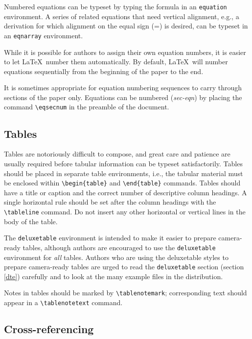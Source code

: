 Numbered equations can be typeset by typing the formula in
an {\tt equation} environment.
A series of related equations that need vertical alignment,
e.g., a derivation for which alignment on the equal sign (=) is desired,
can be typeset in an {\tt eqnarray} environment.

While it is possible for authors to assign their own equation numbers,
it is easier to let \LaTeX\ number them automatically.
By default, \LaTeX\ will number equations sequentially from the
beginning of the paper to the end.

It is sometimes appropriate for equation numbering sequences
to carry through sections of the paper only.
Equations can be numbered ({\it sec-eqn}) by placing the command
\verb"\eqsecnum" in the preamble of the document.

\subsection{Tables}

Tables are notoriously difficult to compose,
and great care and patience are usually required
before tabular information can be typeset satisfactorily.
Tables should be placed in separate table environments,
i.e., the tabular material must be enclosed within
\verb"\begin{table}" and \verb"\end{table}" commands.
Tables should have a title or caption and the correct
number of descriptive column headings.
A single horizontal rule should be set after the column headings
with the \verb"\tableline" command.
Do not insert any other horizontal or vertical
lines in the body of the table.

The {\tt deluxetable} environment is intended to make it easier
to prepare camera-ready tables, although
authors are encouraged to use the {\tt deluxetable} environment
for {\sl all\/} tables.
Authors who are using the deluxetable styles to prepare
camera-ready tables are urged to read the {\tt deluxetable}
section (section \ref{dte}) carefully and to look at the many example files
in the distribution.

Notes in tables should be marked by
\verb"\tablenotemark";
corresponding text should appear in a
\verb"\tablenotetext" command.

\subsection{Cross-referencing}


